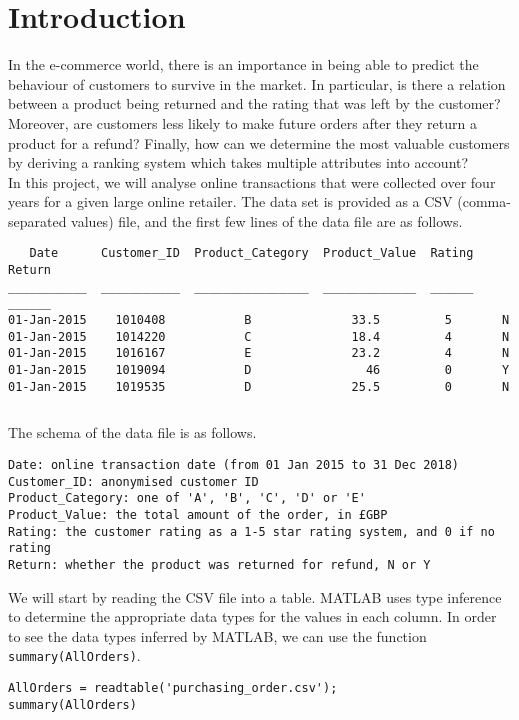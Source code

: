 \section*{Introduction}
In the e-commerce world, there is an importance in being able to predict the behaviour of customers to survive in the market. In particular, is there a relation between a product being returned and the rating that was left by the customer? Moreover, are customers less likely to make future orders after they return a product for a refund? Finally, how can we determine the most valuable customers by deriving a ranking system which takes multiple attributes into account? \\

\noindent
In this project, we will analyse online transactions that were collected over four years for a given large online retailer. The data set is provided as a CSV (comma-separated values) file, and the first few lines of the data file are as follows. \\

\begin{lstlisting}
   Date      Customer_ID  Product_Category  Product_Value  Rating  Return
___________  ___________  ________________  _____________  ______  ______
01-Jan-2015    1010408           B              33.5         5       N 
01-Jan-2015    1014220           C              18.4         4       N 
01-Jan-2015    1016167           E              23.2         4       N 
01-Jan-2015    1019094           D                46         0       Y 
01-Jan-2015    1019535           D              25.5         0       N
\end{lstlisting}
$ $

\noindent
The schema of the data file is as follows.
\begin{lstlisting}[language=none]
Date: online transaction date (from 01 Jan 2015 to 31 Dec 2018)
Customer_ID: anonymised customer ID
Product_Category: one of 'A', 'B', 'C', 'D' or 'E'
Product_Value: the total amount of the order, in £GBP
Rating: the customer rating as a 1-5 star rating system, and 0 if no rating
Return: whether the product was returned for refund, N or Y
\end{lstlisting}

\noindent
We will start by reading the CSV file into a table. MATLAB uses type inference to determine the appropriate data types for the values in each column. In order to see the data types inferred by MATLAB, we can use the function \lstinline|summary(AllOrders)|.
\begin{lstlisting}
AllOrders = readtable('purchasing_order.csv');
summary(AllOrders)
\end{lstlisting}
